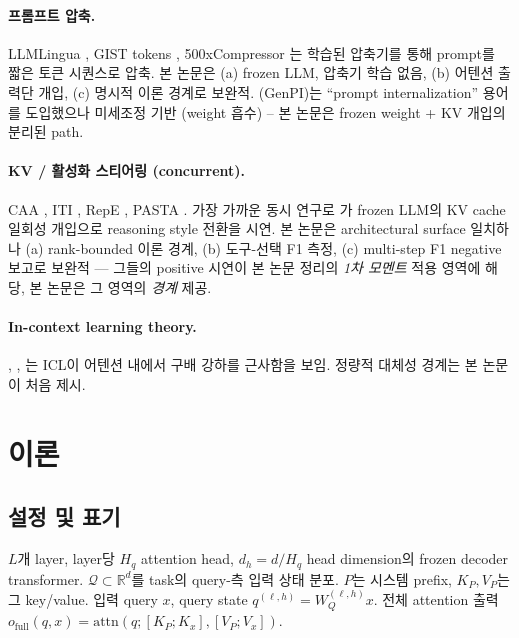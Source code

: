 \documentclass[11pt]{article}
\theoremstyle{definition}
\newcommand{\R}{\mathbb{R}}
\newcommand{\dh}{d_h}
\newcommand{\attn}{\mathrm{attn}}
\begin{document}
\paragraph{프롬프트 압축.}
LLMLingua \citep{jiang2023llmlingua}, GIST tokens \citep{mu2023gist}, 500xCompressor \citep{li2024compressor}는 학습된 압축기를 통해 prompt를 짧은 토큰 시퀀스로 압축. 본 논문은 (a) frozen LLM, 압축기 학습 없음, (b) 어텐션 출력단 개입, (c) 명시적 이론 경계로 보완적. \citet{shin2025genpi} (GenPI)는 ``prompt internalization'' 용어를 도입했으나 미세조정 기반 (weight 흡수) -- 본 논문은 frozen weight + KV 개입의 분리된 path.

\paragraph{KV / 활성화 스티어링 (concurrent).}
CAA \citep{rimsky2024caa}, ITI \citep{li2023iti}, RepE \citep{zou2023repe}, PASTA \citep{zhang2023pasta}. 가장 가까운 동시 연구로 \citet{belitsky2025kvsteer}가 frozen LLM의 KV cache 일회성 개입으로 reasoning style 전환을 시연. 본 논문은 architectural surface 일치하나 (a) rank-bounded 이론 경계, (b) 도구-선택 F1 측정, (c) multi-step F1 negative 보고로 보완적 --- 그들의 positive 시연이 본 논문 정리의 \emph{1차 모멘트} 적용 영역에 해당, 본 논문은 그 영역의 \emph{경계} 제공.

\paragraph{In-context learning theory.}
\citet{akyurek2023icl}, \citet{vonoswald2023icl}, \citet{ahn2023preconditioned}는 ICL이 어텐션 내에서 구배 강하를 근사함을 보임. 정량적 대체성 경계는 본 논문이 처음 제시.

\section{이론}
\label{sec:theory}

\subsection{설정 및 표기}
\label{sec:notation}

$L$개 layer, layer당 $H_q$ attention head, $\dh = d/H_q$ head dimension의 frozen decoder transformer. $\mathcal{Q} \subset \R^d$를 task의 query-측 입력 상태 분포. $P$는 시스템 prefix, $K_P, V_P$는 그 key/value. 입력 query $x$, query state $q^{(\ell,h)} = W_Q^{(\ell,h)}x$. 전체 attention 출력 $o_{\mathrm{full}}(q,x) = \attn(q; [K_P; K_x], [V_P; V_x])$.
\end{document}
